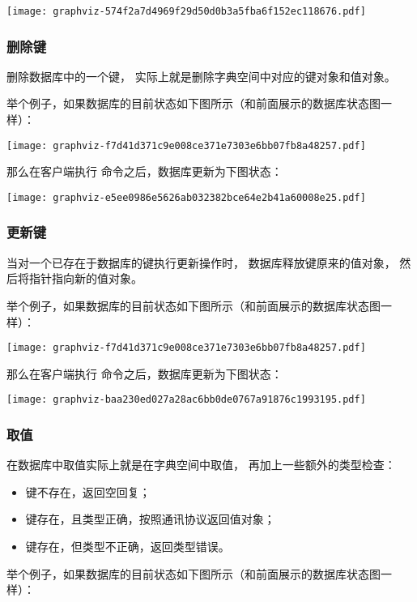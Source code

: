 \documentclass[a4paper,11pt,english]{sphinxmanual}
\begin{document}
\texttt{[image: graphviz-574f2a7d4969f29d50d0b3a5fba6f152ec118676.pdf]}


\subsubsection{删除键}
\label{internal/db:id7}
删除数据库中的一个键，
实际上就是删除字典空间中对应的键对象和值对象。

举个例子，如果数据库的目前状态如下图所示（和前面展示的数据库状态图一样）：

\texttt{[image: graphviz-f7d41d371c9e008ce371e7303e6bb07fb8a48257.pdf]}

那么在客户端执行  命令之后，数据库更新为下图状态：

\texttt{[image: graphviz-e5ee0986e5626ab032382bce64e2b41a60008e25.pdf]}


\subsubsection{更新键}
\label{internal/db:id8}
当对一个已存在于数据库的键执行更新操作时，
数据库释放键原来的值对象，
然后将指针指向新的值对象。

举个例子，如果数据库的目前状态如下图所示（和前面展示的数据库状态图一样）：

\texttt{[image: graphviz-f7d41d371c9e008ce371e7303e6bb07fb8a48257.pdf]}

那么在客户端执行  命令之后，数据库更新为下图状态：

\texttt{[image: graphviz-baa230ed027a28ac6bb0de0767a91876c1993195.pdf]}


\subsubsection{取值}
\label{internal/db:id9}
在数据库中取值实际上就是在字典空间中取值，
再加上一些额外的类型检查：
\begin{itemize}
\item {} 
键不存在，返回空回复；

\item {} 
键存在，且类型正确，按照通讯协议返回值对象；

\item {} 
键存在，但类型不正确，返回类型错误。

\end{itemize}

举个例子，如果数据库的目前状态如下图所示（和前面展示的数据库状态图一样）：
\end{document}
